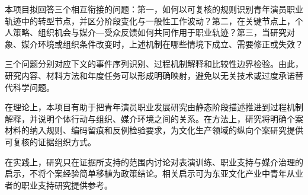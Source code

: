 本项目拟回答三个相互衔接的问题：第一，如何以可复核的规则识别青年演员职业轨迹中的转型节点，并区分阶段变化与一般性工作波动？第二，在关键节点上，个人策略、组织机会与媒介---受众反馈如何共同作用于职业轨迹？第三，当研究对象、媒介环境或组织条件改变时，上述机制在哪些情境下成立、需要修正或失效？

三个问题分别对应下文的事件序列识别、过程机制解释和比较性边界检验。由此，研究内容、材料方法和年度任务可以形成明确映射，避免以无关技术或过度承诺替代科学问题。

在理论上，本项目有助于把青年演员职业发展研究由静态阶段描述推进到过程机制解释，并说明个体行动与组织、媒介环境之间的关系。在方法上，研究将明确个案材料的纳入规则、编码留痕和反例检验要求，为文化生产领域的纵向个案研究提供可复核的证据组织方式。

在实践上，研究只在证据所支持的范围内讨论对表演训练、职业支持与媒介治理的启示，不将个案经验简单移植为政策结论。相关启示可为东亚文化产业中青年从业者的职业支持研究提供参考。
